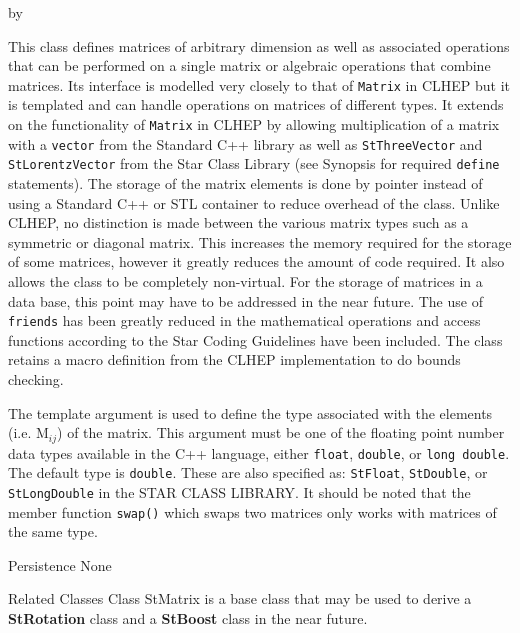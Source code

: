 \documentclass[twoside]{article}
\newcommand{\comp}[1]{\texttt{#1}}%
\newcommand{\entrylabel}[1]{\mbox{\textbf{{#1}}}\hfil}%
\newenvironment{entry}
{\begin{list}{}%
    {\renewcommand{\makelabel}{\entrylabel}%
     \setlength{\labelwidth}{90pt}%
     \setlength{\leftmargin}{\labelwidth}
     \advance\leftmargin by \labelsep%
      }%
    }%
  {\end{list}}
\newcommand{\Entrylabel}[1]%
{\raisebox{0pt}[1ex][0pt]{\makebox[\labelwidth][l]%
    {\parbox[t]{\labelwidth}{\hspace{0pt}\textbf{{#1}}}}}}
\newenvironment{Entry}%
{\renewcommand{\entrylabel}{\Entrylabel}\begin{entry}}%
  {\end{entry}}
\begin{document}
\begin{description}
\begin{Entry}
    This class defines matrices of arbitrary dimension as well as
    associated operations that can be performed on a
    single matrix or algebraic operations that combine matrices.
    Its interface is modelled very closely to that of
    \comp{Matrix} in CLHEP  but it is templated and
    can handle operations on matrices of different types.
    It extends on the functionality of \comp{Matrix} in CLHEP
    by allowing multiplication of a matrix with
    a \comp{vector}  from the Standard C++ library
    as well as \comp{StThreeVector} 
    and \comp{StLorentzVector}  from the
    Star Class Library (see Synopsis for required \comp{define} statements).
    The storage of the matrix elements is done
    by pointer instead of using a Standard C++ or STL container to
    reduce overhead of the class.  Unlike CLHEP, no distinction is made
    between the various matrix types such as a symmetric or diagonal
    matrix.  This increases the memory required for the storage
    of some matrices, however it greatly reduces the amount of code required.
    It also allows the class to be completely non-virtual.
    For the storage of matrices in a data base, this point may have to be
    addressed in the near future.
    The use of \comp{friends} has been greatly reduced in the mathematical
    operations and access functions according to the Star Coding Guidelines
     have been included.  The class
    retains a macro definition from the CLHEP implementation to do bounds
    checking.
    
    The template argument is used to define the type associated with
    the elements (i.e. M$_{ij}$) of the matrix.  This argument must
    be one of the floating point number data types available in
    the C++ language, either \comp{float}, \comp{double},
    or \comp{long double}. The default type is \comp{double}.
    These are also specified as:
    \comp{StFloat}, \comp{StDouble}, or \comp{StLongDouble} in
    the STAR CLASS LIBRARY.  It should be noted that the member function
    \comp{swap()} which swaps two matrices only works with matrices of
    the same type.
    
\item[Persistence]
    None

\item[Related Classes]
    Class StMatrix is a base class that may be used to derive
    a {\bf StRotation} class
    and a {\bf StBoost} class in the near future.


\end{Entry}
\end{description}
\end{document}
